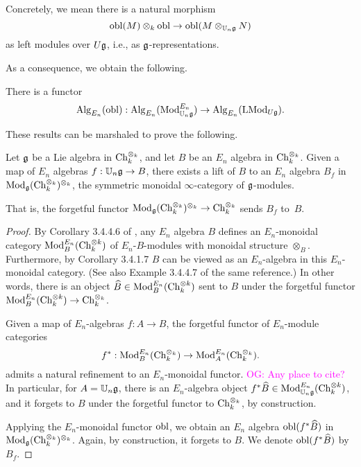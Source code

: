 \documentclass[11pt]{amsart}
\numberwithin{equation}{section}
\def\owen{\textcolor{magenta}{OG: }\textcolor{magenta}}
\begin{document}
Concretely, we mean there is a natural morphism
\[
{\rm obl}(M) \otimes_k {\rm obl} \to {\rm obl}(M \otimes_{\mathbb U_n \mathfrak g} N) 
\]
as left modules over $U\mathfrak g$, i.e., as $\mathfrak g$-representations.

As a consequence, we obtain the following.

\begin{cor}
There is a functor 
\[
{\rm Alg}_{E_n}({\rm obl}): {\rm Alg}_{E_n}({{\rm Mod}^{E_n}_{\mathbb U_n \mathfrak g}}) \to {\rm Alg}_{E_n}({\rm LMod}_{U\mathfrak g}).
\]
\end{cor}

These results can be marshaled to prove the following.

\begin{prp}
Let $\mathfrak g$ be a Lie algebra in ${\rm Ch}_k^{\otimes_k}$, 
and let $B$ be an $E_n$ algebra in ${\rm Ch}_k^{\otimes_k}$.
Given a map of $E_n$ algebras $f: \mathbb U_n \mathfrak g \to B$, 
there exists a lift of $B$ to an $E_n$ algebra $B_f$ in ${\rm Mod}_\mathfrak g({\rm Ch}_k^{\otimes_k})^{\otimes_k}$, the symmetric monoidal $\infty$-category of $\mathfrak g$-modules.
\end{prp}

That is, the forgetful functor ${\rm Mod}_\mathfrak g({\rm Ch}_k^{\otimes_k})^{\otimes_k} \to {\rm Ch}_k^{\otimes_k}$ sends $B_f$ to~$B$.

\begin{proof}
By Corollary 3.4.4.6 of \cite{LurieHA}, any $E_n$ algebra $B$ defines an $E_n$-monoidal category ${\rm Mod}_B^{E_n} ({\rm Ch}_k^{\otimes k})$ of $E_n$-$B$-modules with monoidal structure $\otimes_B$. 
Furthermore, by Corollary 3.4.1.7 \cite{LurieHA} $B$ can be viewed as an $E_n$-algebra in this $E_n$-monoidal category. 
(See also Example 3.4.4.7 of the same reference.)
In other words, there is an object $\widehat{B} \in  {\rm Mod}_B^{E_n} ({\rm Ch}_k^{\otimes k})$ sent to $B$ under the forgetful functor ${\rm Mod}_B^{E_n} ({\rm Ch}_k^{\otimes k}) \to {\rm Ch}_k^{\otimes_k}$. 

Given a map of $E_n$-algebras $f : A \to B$, 
the forgetful functor of $E_n$-module categories 
\[
f^* :  {\rm Mod}_B^{E_n} ({\rm Ch}_k^{\otimes_k}) \to  {\rm Mod}_A^{E_n} ({\rm Ch}_k^{\otimes_k}) .
\]
admits a natural refinement to an $E_n$-monoidal functor.
\owen{Any place to cite?}
In particular, for $A = \mathbb U_n \mathfrak g$, there is an $E_n$-algebra object $f^*\widehat{B} \in {\rm Mod}_{\mathbb U_n \mathfrak g}^{E_n} ({\rm Ch}_k^{\otimes k})$, and it forgets to $B$ under the forgetful functor to ${\rm Ch}_k^{\otimes_k}$, by construction. 

Applying the $E_n$-monoidal functor ${\rm obl}$, we obtain an $E_n$ algebra ${\rm obl}(f^*\widehat{B})$ in ${\rm Mod}_\mathfrak g({\rm Ch}_k^{\otimes_k})^{\otimes_k}$.
Again, by construction, it forgets to $B$.
We denote ${\rm obl}(f^*\widehat{B})$ by~$B_f$.
\end{proof}
\end{document}
